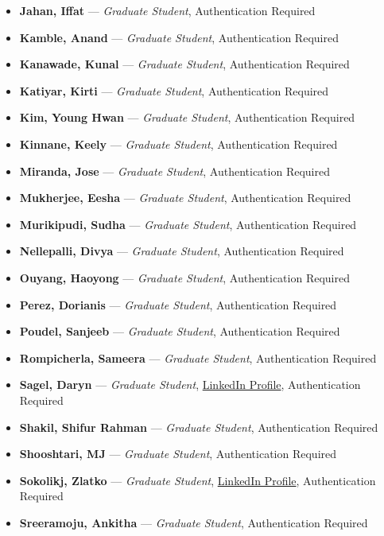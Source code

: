 \documentclass[12pt,a4paper]{article}
\begin{document}
\begin{itemize}
    \item \textbf{Jahan, Iffat} --- \textit{Graduate Student}, Authentication Required
    \item \textbf{Kamble, Anand} --- \textit{Graduate Student}, Authentication Required
    \item \textbf{Kanawade, Kunal} --- \textit{Graduate Student}, Authentication Required
    \item \textbf{Katiyar, Kirti} --- \textit{Graduate Student}, Authentication Required
    \item \textbf{Kim, Young Hwan} --- \textit{Graduate Student}, Authentication Required
    \item \textbf{Kinnane, Keely} --- \textit{Graduate Student}, Authentication Required
    \item \textbf{Miranda, Jose} --- \textit{Graduate Student}, Authentication Required
    \item \textbf{Mukherjee, Eesha} --- \textit{Graduate Student}, Authentication Required
    \item \textbf{Murikipudi, Sudha} --- \textit{Graduate Student}, Authentication Required
    \item \textbf{Nellepalli, Divya} --- \textit{Graduate Student}, Authentication Required
    \item \textbf{Ouyang, Haoyong} --- \textit{Graduate Student}, Authentication Required
    \item \textbf{Perez, Dorianis} --- \textit{Graduate Student}, Authentication Required
    \item \textbf{Poudel, Sanjeeb} --- \textit{Graduate Student}, Authentication Required
    \item \textbf{Rompicherla, Sameera} --- \textit{Graduate Student}, Authentication Required
    \item \textbf{Sagel, Daryn} --- \textit{Graduate Student}, \href{https://www.linkedin.com/in/daryn-sagel-a14002131/}{LinkedIn Profile}, Authentication Required
    \item \textbf{Shakil, Shifur Rahman} --- \textit{Graduate Student}, Authentication Required
    \item \textbf{Shooshtari, MJ} --- \textit{Graduate Student}, Authentication Required
    \item \textbf{Sokolikj, Zlatko} --- \textit{Graduate Student}, \href{https://www.linkedin.com/in/zlatko-sokolikj-053b51134/}{LinkedIn Profile}, Authentication Required
    \item \textbf{Sreeramoju, Ankitha} --- \textit{Graduate Student}, Authentication Required

\end{itemize}
\end{document}
